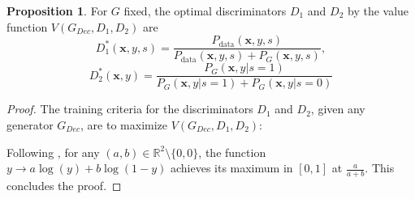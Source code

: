 \documentclass[sigconf]{acmart}
\theoremstyle{definition}
\newtheorem{prop}{Proposition}
\begin{document}
\begin{prop}\label{prop:fairgan}
For $G$ fixed, the optimal discriminators $D_1$ and $D_2$ by the value function $V(G_{Dec}, D_1, D_2)$ are
\[
	D_1^*(\mathbf{x},y,s) = \frac{P_{\text{data}}(\mathbf{x},y,s)} {P_{\text{data}}(\mathbf{x},y,s)+P_{G}(\mathbf{x},y,s)},
\]
\[
	D_2^*(\mathbf{x},y) = \frac{P_{G}(\mathbf{x},y|s=1)}{P_{G}(\mathbf{x},y|s=1)+P_{G}(\mathbf{x},y|s=0)}
\]
\end{prop}

\begin{proof}
The training criteria for the discriminators $D_1$ and $D_2$, given any generator $G_{Dec}$, are to maximize  $V(G_{Dec}, D_1, D_2)$:\\

Following \cite{Goodfellow2014Generative}, for any $(a,b) \in \mathbb{R}^2 \setminus \{0,0\}$, the function $y \rightarrow a\log(y)+b\log(1-y)$ achieves its maximum in $[0,1]$ at $\frac{a}{a+b}$. This concludes the proof.
\end{proof}
\end{document}
